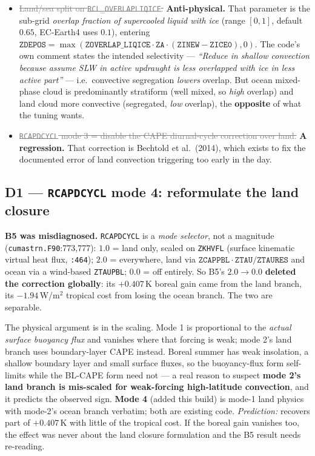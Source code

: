 \documentclass[10pt]{article}
\newcommand{\dead}[1]{\textcolor{gray}{\sout{#1}}}
\begin{document}
\begin{itemize}\itemsep2pt
\item \dead{Land/sea split on \texttt{RCL\_OVERLAPLIQICE}.} \textbf{Anti-physical.} That parameter is the
sub-grid \emph{overlap fraction of supercooled liquid with ice} (range $[0,1]$, default $0.65$, EC-Earth4 uses
$0.1$), entering $\mathtt{ZDEPOS}=\max(\mathtt{ZOVERLAP\_LIQICE}\cdot\mathtt{ZA}\cdot(\mathtt{ZINEW}-\mathtt{ZICE0}),0)$.
The code's own comment states the intended selectivity --- \emph{``Reduce in shallow convection because assume
SLW in active updraught is less overlapped with ice in less active part''} --- i.e.\ convective segregation
\emph{lowers} overlap. But ocean mixed-phase cloud is predominantly stratiform (well mixed, so \emph{high}
overlap) and land cloud more convective (segregated, \emph{low} overlap), the \textbf{opposite} of what the
tuning wants.
\item \dead{\texttt{RCAPDCYCL} mode 3 = disable the CAPE diurnal-cycle correction over land.}
\textbf{A regression.} That correction is Bechtold et al.\ (2014), which exists to fix the documented error of
land convection triggering too early in the day.
\end{itemize}

\subsection{D1 --- \texttt{RCAPDCYCL} mode 4: reformulate the land closure}\label{sub:d1}
\textbf{B5 was misdiagnosed.} \texttt{RCAPDCYCL} is a \emph{mode selector}, not a magnitude
(\texttt{cumastrn.F90}:773,777): $1.0$ = land only, scaled on \texttt{ZKHVFL} (surface kinematic virtual heat
flux, \texttt{:464}); $2.0$ = everywhere, land via $\mathtt{ZCAPPBL}\cdot\mathtt{ZTAU}/\mathtt{ZTAURES}$ and
ocean via a wind-based \texttt{ZTAUPBL}; $0.0$ = off entirely. So B5's $2.0\to0.0$ \textbf{deleted the
correction globally}: its $+0.407$\,K boreal gain came from the land branch, its $-1.94$\,W/m$^2$ tropical cost
from losing the ocean branch. The two are separable.

The physical argument is in the scaling. Mode 1 is proportional to the \emph{actual surface buoyancy flux} and
vanishes where that forcing is weak; mode 2's land branch uses boundary-layer CAPE instead. Boreal summer has
weak insolation, a shallow boundary layer and small surface fluxes, so the buoyancy-flux form self-limits while
the BL-CAPE form need not --- a real reason to suspect \textbf{mode 2's land branch is mis-scaled for
weak-forcing high-latitude convection}, and it predicts the observed sign. \textbf{Mode 4} (added this build)
is mode-1 land physics with mode-2's ocean branch verbatim; both are existing code. \emph{Prediction:} recovers
part of $+0.407$\,K with little of the tropical cost. If the boreal gain vanishes too, the effect was never
about the land closure formulation and the B5 result needs re-reading.
\end{document}
